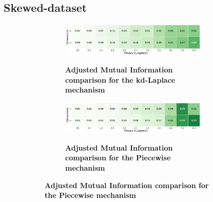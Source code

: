 \subsection{Skewed-dataset}
\begin{figure}[H]
    \centering
    \begin{subfigure}[b]{0.85\textwidth}
        \begin{subfigure}[c]{1\textwidth}
            \caption{\textbf{Adjusted Mutual Information comparison for the kd-Laplace mechanism}}
            \includegraphics[width=1\textwidth]{Results/kd-laplace/kd-Laplace/skewed-dataset/ami.png}
            \label{fig:ami_skewed-dataset_comparison_kdlaplace_2d}
        \end{subfigure}
        \vfill %
        \begin{subfigure}[c]{1\textwidth}
            \caption{\textbf{Adjusted Mutual Information comparison for the Piecewise mechanism}}
            \includegraphics[width=1\textwidth]{Results/kd-laplace/piecewise/skewed-dataset/ami.png}
            \label{fig:ami_skewed-dataset_comparison_piecewise_2d}
        \end{subfigure}
    \end{subfigure}
    \hfill %
    \begin{subfigure}[b]{0.075\textwidth}

\end{subfigure}
\end{figure}
